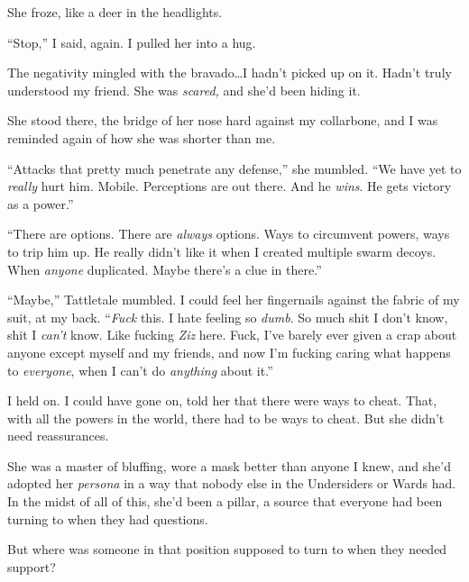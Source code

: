 She froze, like a deer in the headlights.



``Stop,'' I said, again.  I pulled her into a hug.



The negativity mingled with the bravado\ldots I hadn't picked up on it.  Hadn't truly understood my friend.  She was \emph{scared, }and she'd been hiding it.



She stood there, the bridge of her nose hard against my collarbone, and I was reminded again of how she was shorter than me.



``Attacks that pretty much penetrate any defense,'' she mumbled.  ``We have yet to \emph{really} hurt him.  Mobile.  Perceptions are out there.  And he \emph{wins}.  He gets victory as a power.''



``There are options.  There are \emph{always} options.  Ways to circumvent powers, ways to trip him up.  He really didn't like it when I created multiple swarm decoys.  When \emph{anyone} duplicated.  Maybe there's a clue in there.''



``Maybe,'' Tattletale mumbled.  I could feel her fingernails against the fabric of my suit, at my back.  ``\emph{Fuck }this.  I hate feeling so \emph{dumb}.  So much shit I don't know, shit I \emph{can't} know.  Like fucking \emph{Ziz} here.  Fuck, I've barely ever given a crap about anyone except myself and my friends, and now I'm fucking caring what happens to \emph{everyone}, when I can't do \emph{anything} about it.''



I held on.  I could have gone on, told her that there were ways to cheat.  That, with all the powers in the world, there had to be ways to cheat.  But she didn't need reassurances.



She was a master of bluffing, wore a mask better than anyone I knew, and she'd adopted her \emph{persona} in a way that nobody else in the Undersiders or Wards had.  In the midst of all of this, she'd been a pillar, a source that everyone had been turning to when they had questions.



But where was someone in that position supposed to turn to when they needed support?



